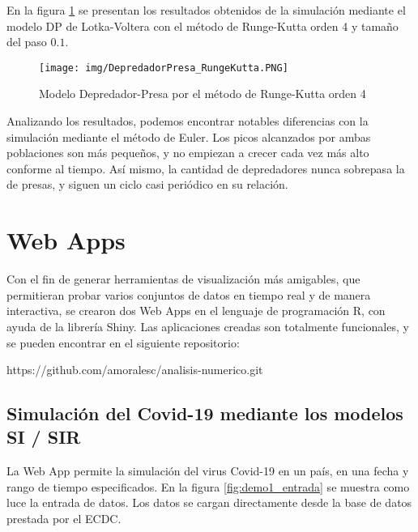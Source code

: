 \documentclass[a4paper,12pt]{article}
\begin{document}
En la figura \ref{fig:dp_rk4} se presentan los resultados obtenidos de la simulación mediante el modelo DP de  Lotka-Voltera  con el método de Runge-Kutta orden 4 y tamaño del paso $0.1$.

\begin{figure}[ht!]
\centering
\texttt{[image: img/DepredadorPresa\_RungeKutta.PNG]}
\vspace{-1em}
\caption{Modelo Depredador-Presa por el método de Runge-Kutta orden 4}
\label{fig:dp_rk4}
\end{figure} \par

Analizando los resultados, podemos encontrar notables diferencias con la simulación mediante el método de Euler. Los picos alcanzados por ambas poblaciones son más pequeños, y no empiezan a crecer cada vez más alto conforme al tiempo. Así mismo, la cantidad de depredadores nunca sobrepasa la de presas, y siguen un ciclo casi periódico en su relación. \par

\newpage


\section{Web Apps}

Con el fin de generar herramientas de visualización más amigables, que permitieran probar varios conjuntos de datos en tiempo real y de manera interactiva, se crearon dos Web Apps en el lenguaje de programación R, con ayuda de la librería Shiny. Las aplicaciones creadas son totalmente funcionales, y se pueden encontrar en el siguiente repositorio: \par

https://github.com/amoralesc/analisis-numerico.git \par

\subsection{Simulación del Covid-19 mediante los modelos SI / SIR}

La Web App permite la simulación del virus Covid-19 en un país, en una fecha y rango de tiempo especificados. En la figura \ref{fig:demo1_entrada} se muestra como luce la entrada de datos. Los datos se cargan directamente desde la base de datos prestada por el ECDC.
\end{document}
